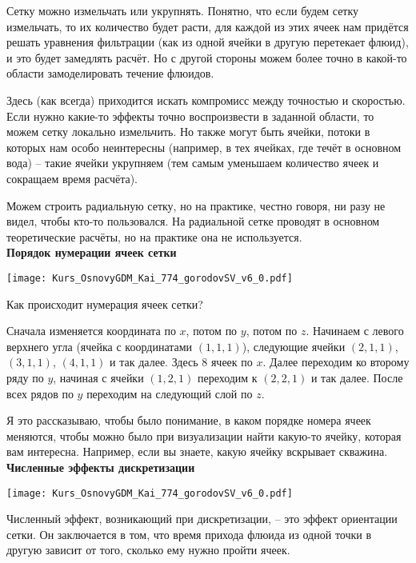 Сетку можно измельчать или укрупнять. Понятно, что если будем сетку измельчать, то их количество будет расти, для каждой из этих ячеек нам придётся решать уравнения фильтрации (как из одной ячейки в другую перетекает флюид), и это будет замедлять расчёт. Но с другой стороны можем более точно в какой-то области замоделировать течение флюидов.

Здесь (как всегда) приходится искать компромисс между точностью и скоростью.
Если нужно какие-то эффекты точно воспроизвести в заданной области, то можем сетку локально измельчить.
Но также могут быть ячейки, потоки в которых нам особо неинтересны (например, в тех ячейках, где течёт в основном вода) -- такие ячейки укрупняем (тем самым уменьшаем количество ячеек и сокращаем время расчёта).

Можем строить радиальную сетку, но на практике, честно говоря, ни разу не видел, чтобы кто-то пользовался.
На радиальной сетке проводят в основном теоретические расчёты, но на практике она не используется.
\\

\textbf{Порядок нумерации ячеек сетки}

\texttt{[image: Kurs\_OsnovyGDM\_Kai\_774\_gorodovSV\_v6\_0.pdf]}

Как происходит нумерация ячеек сетки?

Сначала изменяется координата по $x$, потом по $y$, потом по $z$.
Начинаем с левого верхнего угла (ячейка с координатами $\left(1,1,1\right)$), следующие ячейки $\left(2,1,1\right)$, $\left(3,1,1\right)$, $\left(4,1,1\right)$ и так далее. Здесь 8 ячеек по $x$.
Далее переходим ко второму ряду по $y$, начиная с ячейки $\left(1,2,1\right)$ переходим к $\left(2,2,1\right)$ и так далее.
После всех рядов по $y$ переходим на следующий слой по $z$.

Я это рассказываю, чтобы было понимание, в каком порядке номера ячеек меняются, чтобы можно было при визуализации найти какую-то ячейку, которая вам интересна.
Например, если вы знаете, какую ячейку вскрывает скважина.
\\

\textbf{Численные эффекты дискретизации}

\texttt{[image: Kurs\_OsnovyGDM\_Kai\_774\_gorodovSV\_v6\_0.pdf]}

Численный эффект, возникающий при дискретизации,  -- это эффект ориентации сетки.
Он заключается в том, что время прихода флюида из одной точки в другую зависит от того, сколько ему нужно пройти ячеек.

